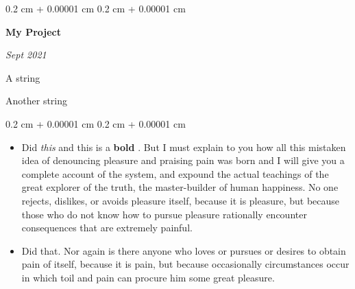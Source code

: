 \documentclass[10pt, letterpaper]{article}
\newenvironment{summary}{
    \begin{description}[
        topsep=0.10 cm,
        parsep=0.10 cm,
        partopsep=0pt,
        itemsep=0pt,
        leftmargin=0.4 cm + 10pt
    ]
}{
    \end{description}
} %
\newenvironment{highlights}{
    \begin{itemize}[
        topsep=0.10 cm,
        parsep=0.10 cm,
        partopsep=0pt,
        itemsep=0pt,
        leftmargin=0.4 cm + 10pt
    ]
}{
    \end{itemize}
} %
\newenvironment{onecolentry}{
    \begin{adjustwidth}{
        0.2 cm + 0.00001 cm
    }{
        0.2 cm + 0.00001 cm
    }
}{
    \end{adjustwidth}
} %
\newenvironment{twocolentry}[2][]{
    \onecolentry
    \def\secondColumn{#2}
    \setcolumnwidth{\fill, 4.5 cm}
    \begin{paracol}{2}
}{
    \switchcolumn \raggedleft \secondColumn
    \end{paracol}
    \endonecolentry
} %
\let\hrefWithoutArrow\href
\renewcommand{\href}[2]{\hrefWithoutArrow{#1}{\ifthenelse{\equal{#2}{}}{ }{#2 }\raisebox{.15ex}{\footnotesize \faExternalLink*}}}
\begin{document}
        \begin{twocolentry}{
            
            
        \textit{Sept 2021}}
            \textbf{My Project}
        \end{twocolentry}
            \begin{summary}
                \item A string
                \item Another string
            \end{summary}
        \vspace{0.10 cm}
        \begin{onecolentry}
            \begin{highlights}
                \item Did \textit{this} and this is a \textbf{bold} \href{https://example.com}{link}. But I must explain to you how all this mistaken idea of denouncing pleasure and praising pain was born and I will give you a complete account of the system, and expound the actual teachings of the great explorer of the truth, the master-builder of human happiness. No one rejects, dislikes, or avoids pleasure itself, because it is pleasure, but because those who do not know how to pursue pleasure rationally encounter consequences that are extremely painful.
                \item Did that. Nor again is there anyone who loves or pursues or desires to obtain pain of itself, because it is pain, but because occasionally circumstances occur in which toil and pain can procure him some great pleasure.
            \end{highlights}
        \end{onecolentry}


        \vspace{0.2 cm}
\end{document}
